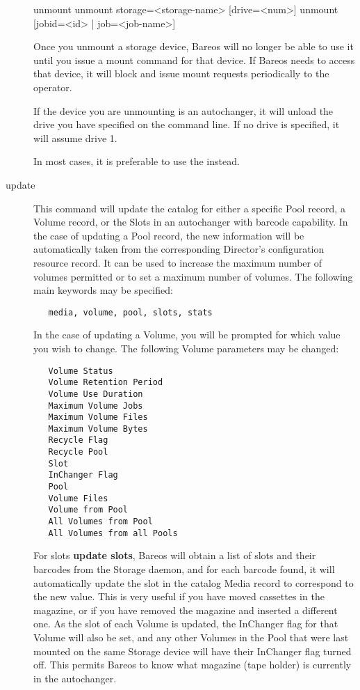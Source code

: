 \begin{description}
\begin{bconsole}{unmount}
unmount storage=<storage-name> [drive=<num>]
unmount [jobid=<id> | job=<job-name>]
\end{bconsole}

   Once you unmount a storage device, Bareos will no longer be able to use
   it until you issue a mount command for that device. If Bareos needs to
   access that device, it will block and issue mount requests periodically
   to the operator.

   If the device you are unmounting is an autochanger, it will unload
   the drive you have specified on the command line. If no drive is
   specified, it will assume drive 1.

   In most cases, it is preferable to use the  instead.

\item [update]
   \label{UpdateCommand}
   This command will update the catalog for either a specific Pool record, a Volume
   record, or the Slots in an  autochanger with barcode capability. In the case
   of updating a  Pool record, the new information will be automatically taken
   from  the corresponding Director's configuration resource record. It  can be
   used to increase the maximum number of volumes permitted or  to set a maximum
   number of volumes. The following main  keywords may be specified:

\footnotesize
\begin{verbatim}
   media, volume, pool, slots, stats
\end{verbatim}
\normalsize

In the case of updating a  Volume, you will be prompted for which value you
wish to change.  The following Volume parameters may be changed:

\footnotesize
\begin{verbatim}
   Volume Status
   Volume Retention Period
   Volume Use Duration
   Maximum Volume Jobs
   Maximum Volume Files
   Maximum Volume Bytes
   Recycle Flag
   Recycle Pool
   Slot
   InChanger Flag
   Pool
   Volume Files
   Volume from Pool
   All Volumes from Pool
   All Volumes from all Pools
\end{verbatim}
\normalsize

   For slots {\bf update slots}, Bareos will obtain a list of slots and
   their barcodes from the Storage daemon, and for each barcode found, it
   will automatically update the slot in the catalog Media record to
   correspond to the new value.  This is very useful if you have moved
   cassettes in the magazine, or if you have removed the magazine and
   inserted a different one.  As the slot of each Volume is updated, the
   InChanger flag for that Volume will also be set, and any other Volumes
   in the Pool that were last mounted on the same Storage device
   will have their InChanger flag turned off.  This permits
   Bareos to know what magazine (tape holder) is currently in the
   autochanger.


\end{description}
